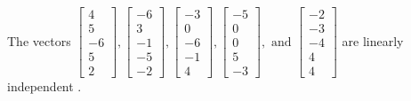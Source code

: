 \begin{exercise}
\begin{exerciseStatement}
  \end{exerciseStatement}
  \begin{exerciseAnswer}
   The vectors \(\left[\begin{array}{r}
4 \\
5 \\
-6 \\
5 \\
2
\end{array}\right] , \left[\begin{array}{r}
-6 \\
3 \\
-1 \\
-5 \\
-2
\end{array}\right] , \left[\begin{array}{r}
-3 \\
0 \\
-6 \\
-1 \\
4
\end{array}\right] , \left[\begin{array}{r}
-5 \\
0 \\
0 \\
5 \\
-3
\end{array}\right] , \text{ and } \left[\begin{array}{r}
-2 \\
-3 \\
-4 \\
4 \\
4
\end{array}\right]\) are 
  	 linearly independent  .
  


  \end{exerciseAnswer}
\end{exercise}